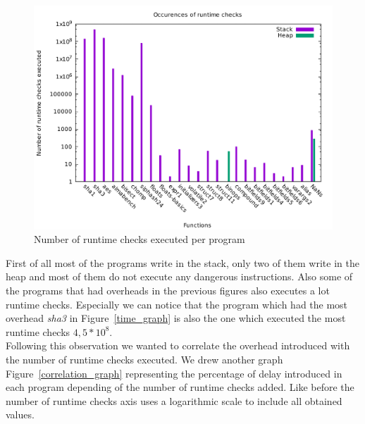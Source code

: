 \documentclass[11pt]{sdm}
\begin{document}
\begin{figure}[!ht]
\centering
\includegraphics[width=1\textwidth]{images/occurence_graph.pdf}
\caption{Number of runtime checks executed per program}
\label{occurence_graph}
\end{figure}

First of all most of the programs write in the stack, only two of them write in the heap and most of them do not execute any dangerous instructions. Also some of the programs that had overheads in the previous figures also executes a lot runtime checks.
Especially we can notice that the program which had the most overhead \textit{sha3} in Figure~\ref{time_graph} is also the one which executed the most runtime checks $4,5*10^8$. \\
Following this observation we wanted to correlate the overhead introduced with the number of runtime checks executed.
We drew another graph Figure~\ref{correlation_graph} representing the percentage of delay introduced in each program depending of the number of runtime checks added. Like before the number of runtime checks axis uses a logarithmic scale to include all obtained values.
\end{document}
